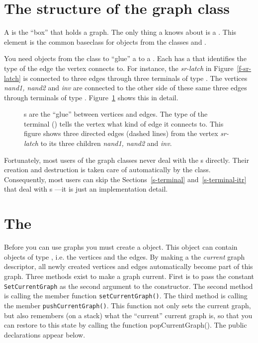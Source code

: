 \section{The structure of the graph class}
A  is the ``box'' that holds a graph. The only thing a
 knows about is a . This element is
the common baseclass for objects from the classes  and
.

You need objects from the class  to ``glue'' a
 to a . Each  has a
 that identifies the type of the edge the vertex connects
to. For instance, the  {\sl sr-latch} in
Figure~\ref{f-sr-latch} is connected to three edges through three terminals of
type . The vertices {\sl nand1, nand2} and {\sl inv\/} are
connected to the other side of these same three edges through terminals of type
. Figure~\ref{f-graphglue} shows this in detail.

\begin{figure}[hbt]
\caption{\label{f-graphglue}
s are the ``glue'' between vertices and edges.
The type of the terminal () tells the vertex what kind of
edge it connects to. This figure shows three directed edges (dashed lines) from
the vertex {\sl sr-latch} to its three children {\sl nand1, nand2} and {\sl
inv}.}
\end{figure}

Fortunately, most users of the graph classes never deal with the
s directly. Their creation and destruction is taken care
of automatically by the  class. Consequently, most users can
skip the Sections~\ref{s-terminal} and~\ref{s-terminal-itr} that deal with
s ---it is just an implementation detail.

\section{The }
Before you can use graphs you must create a  object.
This object can contain objects of type , i.e. the vertices
and the edges. By making a  the {\em current}
graph descriptor, all newly created vertices and edges automatically become
part of this graph. Three methods exist to make a graph current. First is to pass
the constant {\tt SetCurrentGraph} as the second argument to the constructor.
The second method is calling the member function {\tt setCurrentGraph()}. The
third method is calling the member {\tt pushCurrentGraph()}. This function not
only sets the current graph, but also remembers (on a stack) what the
``current'' current graph is, so that you can restore to this state by calling
the function popCurrentGraph().  The public declarations appear below.


